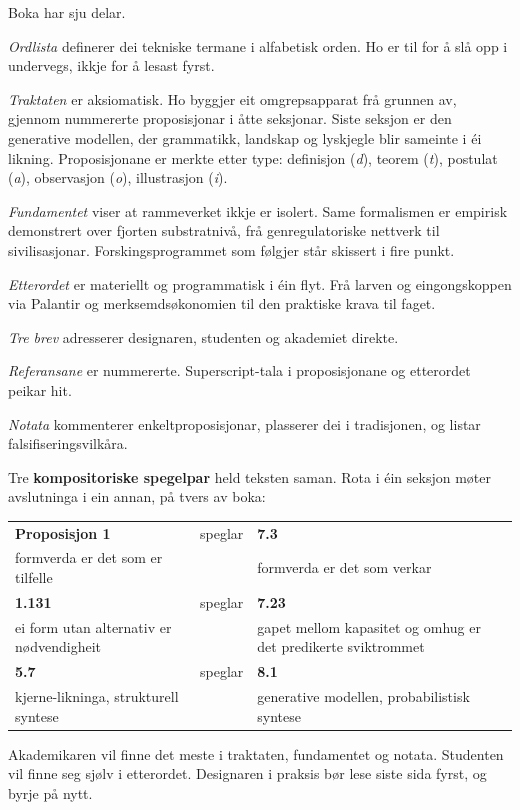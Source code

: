 \begin{widebody}
\begin{foreordbody}

Boka har sju delar.

\textit{Ordlista} definerer dei tekniske termane i alfabetisk orden. Ho er til for å slå opp i undervegs, ikkje for å lesast fyrst.

\textit{Traktaten} er aksiomatisk. Ho byggjer eit omgrepsapparat frå grunnen av, gjennom nummererte proposisjonar i åtte seksjonar. Siste seksjon er den generative modellen, der grammatikk, landskap og lyskjegle blir sameinte i éi likning. Proposisjonane er merkte etter type: definisjon (\textit{d}), teorem (\textit{t}), postulat (\textit{a}), observasjon (\textit{o}), illustrasjon (\textit{i}).

\textit{Fundamentet} viser at rammeverket ikkje er isolert. Same formalismen er empirisk demonstrert over fjorten substratnivå, frå genregulatoriske nettverk til sivilisasjonar. Forskingsprogrammet som følgjer står skissert i fire punkt.

\textit{Etterordet} er materiellt og programmatisk i éin flyt. Frå larven og eingongskoppen via Palantir og merksemdsøkonomien til den praktiske krava til faget.

\textit{Tre brev} adresserer designaren, studenten og akademiet direkte.

\textit{Referansane} er nummererte. Superscript-tala i proposisjonane og etterordet peikar hit.

\textit{Notata} kommenterer enkeltproposisjonar, plasserer dei i tradisjonen, og listar falsifiseringsvilkåra.

Tre \textbf{kompositoriske spegelpar} held teksten saman. Rota i éin seksjon møter avslutninga i ein annan, på tvers av boka:

\begin{center}\footnotesize
\renewcommand{\arraystretch}{1.2}
\begin{tabular}{@{}p{28mm}p{24mm}p{28mm}@{}}
\toprule
\textbf{Proposisjon 1} & speglar & \textbf{7.3} \\
formverda er det som er tilfelle & & formverda er det som verkar \\[4pt]
\textbf{1.131} & speglar & \textbf{7.23} \\
ei form utan alternativ er nødvendigheit & & gapet mellom kapasitet og omhug er det predikerte sviktrommet \\[4pt]
\textbf{5.7} & speglar & \textbf{8.1} \\
kjerne-likninga, strukturell syntese & & generative modellen, probabilistisk syntese \\
\bottomrule
\end{tabular}
\end{center}

Akademikaren vil finne det meste i traktaten, fundamentet og notata. Studenten vil finne seg sjølv i etterordet. Designaren i praksis bør lese siste sida fyrst, og byrje på nytt.

\end{foreordbody}
\end{widebody}
